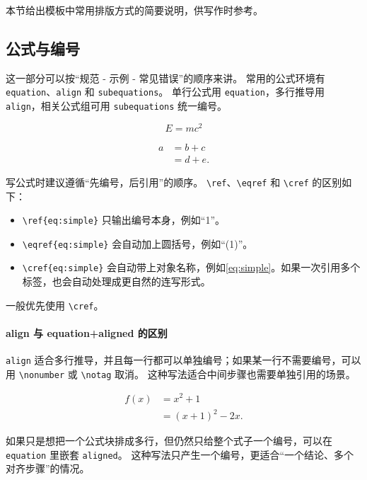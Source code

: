 本节给出模板中常用排版方式的简要说明，供写作时参考。

\subsection{公式与编号}
这一部分可以按“规范 - 示例 - 常见错误”的顺序来讲。
常用的公式环境有 \texttt{equation}、\texttt{align} 和 \texttt{subequations}。
单行公式用 \texttt{equation}，多行推导用 \texttt{align}，相关公式组可用 \texttt{subequations} 统一编号。

\begin{equation}\label{eq:simple}
E = mc^2
\end{equation}

\begin{align}
a &= b + c \label{eq:align-a}\\
  &= d + e. \label{eq:align-b}
\end{align}

写公式时建议遵循“先编号，后引用”的顺序。
\texttt{\textbackslash ref}、\texttt{\textbackslash eqref} 和 \texttt{\textbackslash cref} 的区别如下：
\begin{itemize}
    \item \texttt{\textbackslash ref\{eq:simple\}} 只输出编号本身，例如“1”。
    \item \texttt{\textbackslash eqref\{eq:simple\}} 会自动加上圆括号，例如“(1)”。
    \item \texttt{\textbackslash cref\{eq:simple\}} 会自动带上对象名称，例如\cref{eq:simple}。如果一次引用多个标签，也会自动处理成更自然的连写形式。
\end{itemize}
一般优先使用 \texttt{\textbackslash cref}。

\paragraph{align 与 equation+aligned 的区别}
\texttt{align} 适合多行推导，并且每一行都可以单独编号；如果某一行不需要编号，可以用 \texttt{\textbackslash nonumber} 或 \texttt{\textbackslash notag} 取消。
这种写法适合中间步骤也需要单独引用的场景。

\begin{align}
f(x) &= x^2 + 1 \label{eq:align-demo-a}\\
     &= (x+1)^2 - 2x. \label{eq:align-demo-b}
\end{align}

如果只是想把一个公式块排成多行，但仍然只给整个式子一个编号，可以在 \texttt{equation} 里嵌套 \texttt{aligned}。
这种写法只产生一个编号，更适合“一个结论、多个对齐步骤”的情况。

